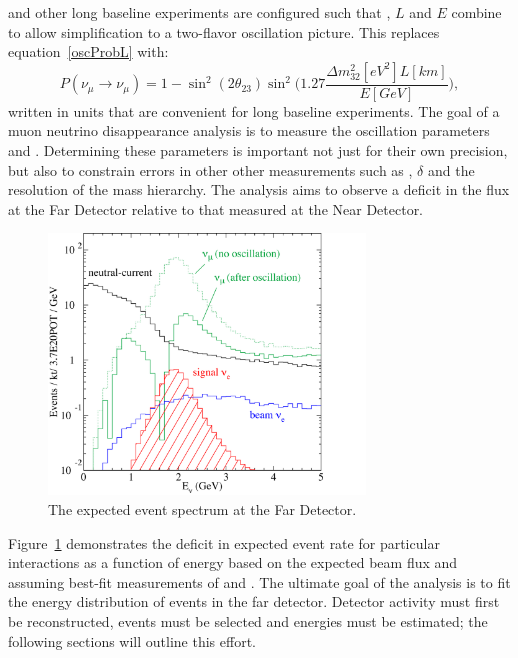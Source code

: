 \nova and other long baseline experiments are configured such that \deltamtht, $L$ and $E$ combine to allow simplification to a two-flavor oscillation picture.  This replaces equation~\eqref{oscProbL} with:
\begin{equation}\label{muSurvProb}
P(\nu_\mu \rightarrow \nu_\mu) = 1 - \sin^2(2 \theta_{23})\sin^2 \bigg( 1.27 \frac{\Delta m^2_{32}[eV^2] L[km]}{E[GeV]} \bigg ), 
\end{equation}
written in units that are convenient for long baseline experiments.  The goal of a muon neutrino disappearance analysis is to measure the oscillation parameters \thetatth and \deltamtht. Determining these parameters is important not just for their own precision, but also to constrain errors in other other measurements such as \thetaoth, $\delta$ and the resolution of the mass hierarchy.  The analysis aims to observe a deficit in the \numu flux at the Far Detector relative to that measured at the Near Detector.  
\begin{figure}[h]
\begin{center}
\includegraphics[width=0.75\textwidth]{plots_nova/nuEventSpectrum.png}
\end{center}
\caption{The expected event spectrum at the \nova Far Detector.}
\label{spectrum}
\end{figure}
Figure~\ref{spectrum} demonstrates the deficit in expected event rate for particular interactions as a function of energy based on the expected beam flux and assuming best-fit measurements of \thetatth and \deltamtht.\cite{pdg}  The ultimate goal of the analysis is to fit the energy distribution of events in the far detector.  Detector activity must first be reconstructed, events must be selected and energies must be estimated; the following sections will outline this effort.



